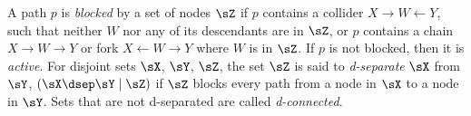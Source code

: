 










\begin{definition}%
\label{def:d-separation}
    A path $p$ is \emph{blocked} by a set of nodes $\sZ$ if $p$ contains a collider $X \to W \gets Y$, such that neither $W$ nor any of its descendants are in $\sZ$, 
    or $p$ contains a chain $X \to W \to Y$ or fork $X \gets W \to Y$ where $W$ is in $\sZ$.
    If $p$ is not blocked, then it is \emph{active}.
    For disjoint sets $\sX$, $\sY$, $\sZ$, the set $\sZ$ is said to \emph{d-separate} $\sX$ from $\sY$,
    ${(\sX \dsep \sY \mid \sZ)}$ if $\sZ$ blocks every path
    from a node in $\sX$ to a node in $\sY$. Sets that are not d-separated are
    called \emph{d-connected}.~
\end{definition}


